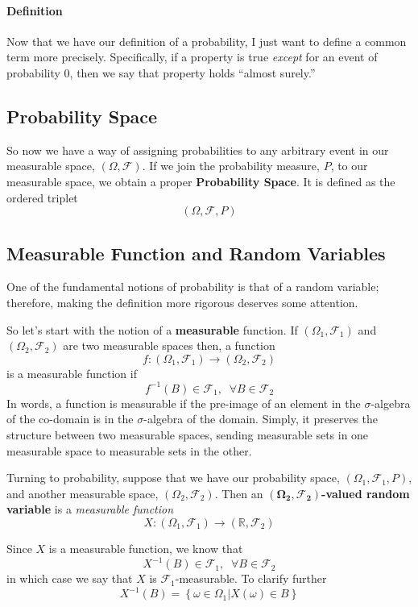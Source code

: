 \documentclass[12pt]{article}
\theoremstyle{plain}
\theoremstyle{definition}
\theoremstyle{remark}
\begin{document}
\paragraph{Definition} Now that we have our definition of a probability,
I just want to define a common term more precisely.  Specifically,
if a property is true \emph{except} for an event of probability 0,
then we say that property holds ``almost surely.''

\subsection{Probability Space}

So now we have a way of assigning probabilities to any arbitrary event in our measurable space, $(\Omega, \mathcal{F})$. If we
join the probability measure, $P$, to our measurable space, we obtain a proper \textbf{Probability Space}.  It is defined as
the ordered triplet
\[(\Omega, \mathcal{F}, P) \]

\subsection{Measurable Function and Random Variables}

One of the fundamental notions of probability is that of a random
variable; therefore, making the definition more rigorous
deserves some attention.

So let's start with the notion of a \textbf{measurable} function.
If $(\Omega_1, \mathcal{F}_1)$ and $(\Omega_2, \mathcal{F}_2)$ are two
measurable spaces then, a function
   \[ f: (\Omega_1, \mathcal{F}_1) \rightarrow (\Omega_2, \mathcal{F}_2)
      \]
is a measurable function if
   \[ f^{-1}(B) \in \mathcal{F}_1, \;\; \forall B \in\mathcal{F}_2 \]
In words, a function is measurable if the pre-image of an element in
the $\sigma$-algebra of the co-domain is in the
$\sigma$-algebra of the domain.  Simply, it preserves the structure
between two measurable spaces, sending measurable sets
in one measurable space to measurable sets in the other.

Turning to probability, suppose  that we have our probability space,
$(\Omega_1, \mathcal{F}_1, P)$, and another measurable space,
$(\Omega_2,\mathcal{F}_2)$.  Then an
$\mathbf{(\Omega_2, \mathcal{F}_2)}$\textbf{-valued random variable}
is a \emph{measurable function}
\[ X: (\Omega_1, \mathcal{F}_1) \rightarrow (\mathbb{R},
   \mathcal{F}_2) \]

Since $X$ is a measurable function, we know that
   \[ X^{-1}(B) \in \mathcal{F}_1, \;\; \forall B \in \mathcal{F}_2\]
in which case we say that $X$ is $\mathcal{F}_1$-measurable.
To clarify further
   \[ X^{-1}(B) = \left\{ \omega \in \Omega_1 | X(\omega)
      \in B \right\} \]
\end{document}
